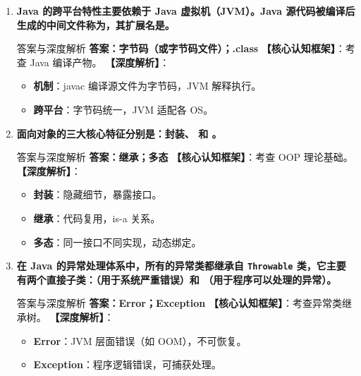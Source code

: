 ﻿\documentclass[12pt, a4paper]{ctexart}
\newcommand{\code}[1]{\texttt{#1}}
\begin{document}
\begin{enumerate}[label=\textbf{\arabic*.}, leftmargin=*, itemsep=1.5em]
	\item \textbf{Java 的跨平台特性主要依赖于 Java 虚拟机（JVM）。Java 源代码被编译后生成的中间文件称为\underline{\hspace{4cm}}，其扩展名是\underline{\hspace{3cm}}。}
	      \begin{bluebox}{答案与深度解析}
		      \textbf{答案：字节码（或字节码文件）；.class}
		      \textbf{【核心认知框架】}：考查 Java 编译产物。
		      \textbf{【深度解析】}：
		      \begin{itemize}[leftmargin=*, nosep]
			      \item \textbf{机制}：javac 编译源文件为字节码，JVM 解释执行。
			      \item \textbf{跨平台}：字节码统一，JVM 适配各 OS。
		      \end{itemize}
	      \end{bluebox}

	\item \textbf{面向对象的三大核心特征分别是：封装、\underline{\hspace{4cm}} 和 \underline{\hspace{4cm}}。}
	      \begin{bluebox}{答案与深度解析}
		      \textbf{答案：继承；多态}
		      \textbf{【核心认知框架】}：考查 OOP 理论基础。
		      \textbf{【深度解析】}：
		      \begin{itemize}[leftmargin=*, nosep]
			      \item \textbf{封装}：隐藏细节，暴露接口。
			      \item \textbf{继承}：代码复用，is-a 关系。
			      \item \textbf{多态}：同一接口不同实现，动态绑定。
		      \end{itemize}
	      \end{bluebox}

	\item \textbf{在 Java 的异常处理体系中，所有的异常类都继承自 \code{Throwable} 类，它主要有两个直接子类：\underline{\hspace{4cm}}（用于系统严重错误）和 \underline{\hspace{4cm}}（用于程序可以处理的异常）。}
	      \begin{bluebox}{答案与深度解析}
		      \textbf{答案：Error；Exception}
		      \textbf{【核心认知框架】}：考查异常类继承树。
		      \textbf{【深度解析】}：
		      \begin{itemize}[leftmargin=*, nosep]
			      \item \textbf{Error}：JVM 层面错误（如 OOM），不可恢复。
			      \item \textbf{Exception}：程序逻辑错误，可捕获处理。
		      \end{itemize}
	      \end{bluebox}


\end{enumerate}
\end{document}
